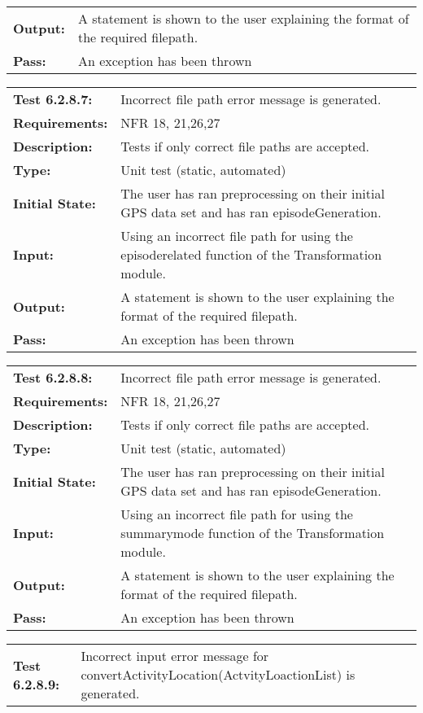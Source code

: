\documentclass[12pt, titlepage]{article}
\begin{document}
{\begin{tabular}{|l|p{10cm}|}
    \bf{Output}: & A statement is shown to the user explaining the format of the required filepath. \\
    \bf{Pass}: & An exception has been thrown \\
    \hline
\end{tabular}
\begin{tabular}{|l|p{10cm}|}
    \hline
    \bf{Test} 6.2.8.7: & Incorrect file path error message is generated.\\
    \bf{Requirements}: & NFR 18, 21,26,27 \\
    \bf{Description}: & Tests if only correct file paths are accepted. \\
    \bf{Type}: & Unit test (static, automated) \\
    \bf{Initial State}: & The user has ran preprocessing on their initial GPS data set and has ran episodeGeneration. \\
    \bf{Input}: & Using an incorrect file path for using the episoderelated function of the Transformation module.\\
    \bf{Output}: & A statement is shown to the user explaining the format of the required filepath. \\
    \bf{Pass}: & An exception has been thrown \\
    \hline
\end{tabular}
\begin{tabular}{|l|p{10cm}|}
    \hline
    \bf{Test} 6.2.8.8: & Incorrect file path error message is generated.\\
    \bf{Requirements}: & NFR 18, 21,26,27 \\
    \bf{Description}: & Tests if only correct file paths are accepted. \\
    \bf{Type}: & Unit test (static, automated) \\
    \bf{Initial State}: & The user has ran preprocessing on their initial GPS data set and has ran episodeGeneration. \\
    \bf{Input}: & Using an incorrect file path for using the summarymode function of the Transformation module.\\
    \bf{Output}: & A statement is shown to the user explaining the format of the required filepath. \\
    \bf{Pass}: & An exception has been thrown \\
    \hline
\end{tabular}
\begin{tabular}{|l|p{10cm}|}
    \hline
    \bf{Test} 6.2.8.9: & Incorrect input error message for convertActivityLocation(ActvityLoactionList) is generated.\\

\end{tabular}}
\end{document}
